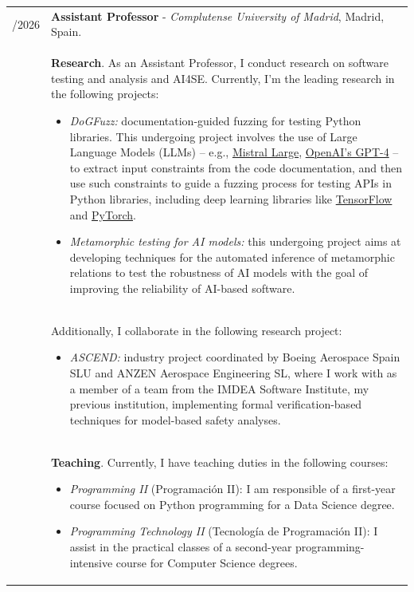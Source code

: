 \documentclass[a4paper,10pt]{article} %
\begin{document}
\begin{longtable}{>{\raggedleft\arraybackslash}p{} p{}}
2025/2026 & \textbf{Assistant Professor} - \textit{Complutense University of Madrid}, Madrid, Spain. \\  
& \textbf{Research}. As an Assistant Professor, I conduct research on software testing and analysis and AI4SE. Currently, I'm the leading research in the following projects: 
\begin{itemize}
\setlength\itemsep{0.1em}
\item \textit{DoGFuzz:} documentation-guided fuzzing for testing Python libraries. This undergoing project involves the use of Large Language Models (LLMs) -- e.g., \href{https://mistral.ai/news/mistral-large}{Mistral Large}, \href{https://openai.com/index/gpt-4/}{OpenAI's GPT-4} -- to extract input constraints from the code documentation, and then use such constraints to guide a fuzzing process for testing APIs in Python libraries, including 
deep learning libraries
like \href{https://www.tensorflow.org/}{TensorFlow} and \href{https://pytorch.org/}{PyTorch}. 
\item \textit{Metamorphic testing for AI models:} this undergoing project aims at developing techniques for the automated inference of metamorphic relations to test the robustness of AI models with the goal of improving the reliability of AI-based software.
\end{itemize} \\
& Additionally, I collaborate in the following research project:
\begin{itemize}
\setlength\itemsep{0.1em}
\item \textit{ASCEND:} industry project coordinated by Boeing Aerospace Spain SLU and ANZEN Aerospace Engineering SL, where I work with as a member of a team from the IMDEA Software Institute, my previous institution, implementing formal verification-based techniques for model-based safety analyses.
\end{itemize} \\
& \textbf{Teaching}. Currently, I have teaching duties in the following courses:
\begin{itemize}
\setlength\itemsep{0.1em}
\item \textit{Programming II} (Programación II): I am responsible of a first-year course focused on Python programming for a Data Science degree. 
\item \textit{Programming Technology II} (Tecnología de Programación II): I assist in the practical classes of
a second-year programming-intensive course for Computer Science degrees. 
\end{itemize} \\


\end{longtable}
\end{document}
